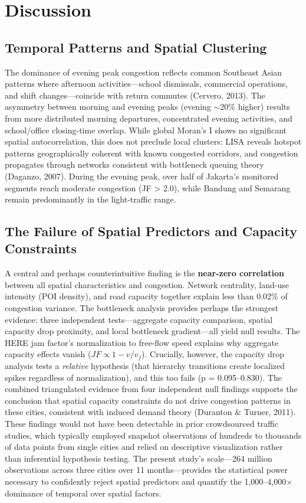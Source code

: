 \documentclass[12pt,a4paper]{article}
\begin{document}
\section{Discussion}

\subsection{Temporal Patterns and Spatial Clustering}

The dominance of evening peak congestion reflects common Southeast Asian patterns where afternoon activities---school dismissals, commercial operations, and shift changes---coincide with return commutes (Cervero, 2013). The asymmetry between morning and evening peaks (evening $\sim$20\% higher) results from more distributed morning departures, concentrated evening activities, and school/office closing-time overlap. While global Moran's I shows no significant spatial autocorrelation, this does not preclude local clusters: LISA reveals hotspot patterns geographically coherent with known congested corridors, and congestion propagates through networks consistent with bottleneck queuing theory (Daganzo, 2007). During the evening peak, over half of Jakarta's monitored segments reach moderate congestion (JF > 2.0), while Bandung and Semarang remain predominantly in the light-traffic range.

\subsection{The Failure of Spatial Predictors and Capacity Constraints}

A central and perhaps counterintuitive finding is the \textbf{near-zero correlation} between all spatial characteristics and congestion. Network centrality, land-use intensity (POI density), and road capacity together explain less than 0.02\% of congestion variance. The bottleneck analysis provides perhaps the strongest evidence: three independent tests---aggregate capacity comparison, spatial capacity drop proximity, and local bottleneck gradient---all yield null results. The HERE jam factor's normalization to free-flow speed explains why aggregate capacity effects vanish ($JF \propto 1 - v/v_f$). Crucially, however, the capacity drop analysis tests a \emph{relative} hypothesis (that hierarchy transitions create localized spikes regardless of normalization), and this too fails (p = 0.095--0.830). The combined triangulated evidence from four independent null findings supports the conclusion that spatial capacity constraints do not drive congestion patterns in these cities, consistent with induced demand theory (Duranton \& Turner, 2011). These findings would not have been detectable in prior crowdsourced traffic studies, which typically employed snapshot observations of hundreds to thousands of data points from single cities and relied on descriptive visualization rather than inferential hypothesis testing. The present study's scale---264 million observations across three cities over 11 months---provides the statistical power necessary to confidently reject spatial predictors and quantify the 1,000--4,000$\times$ dominance of temporal over spatial factors.
\end{document}
